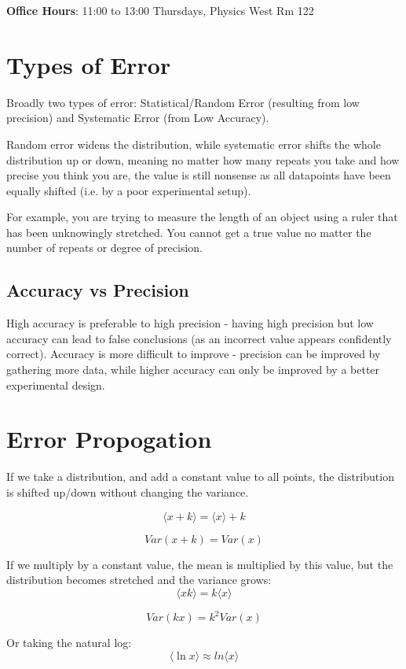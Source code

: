 \graphicspath{{figures/}}

\textbf{Office Hours}: 11:00 to 13:00 Thursdays, Physics West Rm 122

\section*{Types of Error}
Broadly two types of error: Statistical/Random Error (resulting from low precision) and Systematic Error (from Low Accuracy).

Random error widens the distribution, while systematic error shifts the whole distribution up or down, meaning no matter how many repeats you take and how precise you think you are, the value is still nonsense as all datapoints have been equally shifted (i.e. by a poor experimental setup).

For example, you are trying to measure the length of an object using a ruler that has been unknowingly stretched. You cannot get a true value no matter the number of repeats or degree of precision.

\subsection*{Accuracy vs Precision}
High accuracy is preferable to high precision - having high precision but low accuracy can lead to false conclusions (as an incorrect value appears confidently correct). Accuracy is more difficult to improve - precision can be improved by gathering more data, while higher accuracy can only be improved by a better experimental design.

\section*{Error Propogation}
If we take a distribution, and add a constant value to all points, the distribution is shifted up/down without changing the variance.

\[
    \langle x+k \rangle = \langle x \rangle + k
\]

\[
    Var(x+k) = Var(x)
\]

If we multiply by a constant value, the mean is multiplied by this value, but the distribution becomes stretched and the variance grows:
\[
    \langle xk \rangle = k \langle x \rangle
\]

\[
    Var(kx) = k^2 Var(x)
\]

Or taking the natural log:
\[
    \langle \ln x \rangle \approx ln \langle x \rangle
\]

